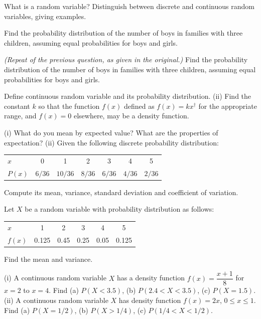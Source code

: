 \documentclass[11pt,a4paper]{article}
\begin{document}
\begin{longlist}
\item What is a random variable? Distinguish between discrete and continuous random variables, giving examples.

\item Find the probability distribution of the number of boys in families with three children, assuming equal probabilities for boys and girls.

\item \emph{(Repeat of the previous question, as given in the original.)} Find the probability distribution of the number of boys in families with three children, assuming equal probabilities for boys and girls.

\item Define continuous random variable and its probability distribution. (ii) Find the constant $k$ so that the function $f(x)$ defined as $f(x)=kx^\dagger$ for the appropriate range, and $f(x)=0$ elsewhere, may be a density function.

\item (i) What do you mean by expected value? What are the properties of expectation? (ii) Given the following discrete probability distribution:
\begin{center}
\begin{tabular}{l cccccc}
\toprule
$x$ & 0 & 1 & 2 & 3 & 4 & 5 \\
$P(x)$ & $6/36$ & $10/36$ & $8/36$ & $6/36$ & $4/36$ & $2/36$ \\
\bottomrule
\end{tabular}
\end{center}
Compute its mean, variance, standard deviation and coefficient of variation.

\item Let $X$ be a random variable with probability distribution as follows:
\begin{center}
\begin{tabular}{l ccccc}
\toprule
$x$ & 1 & 2 & 3 & 4 & 5 \\
$f(x)$ & 0.125 & 0.45 & 0.25 & 0.05 & 0.125 \\
\bottomrule
\end{tabular}
\end{center}
Find the mean and variance.

\item (i) A continuous random variable $X$ has a density function $f(x)=\dfrac{x+1}{8}$ for $x=2$ to $x=4$. Find (a) $P(X<3.5)$, (b) $P(2.4<X<3.5)$, (c) $P(X=1.5)$. (ii) A continuous random variable $X$ has density function $f(x)=2x$, $0\leq x\leq 1$. Find (a) $P(X=1/2)$, (b) $P(X>1/4)$, (c) $P(1/4<X<1/2)$.


\end{longlist}
\end{document}
